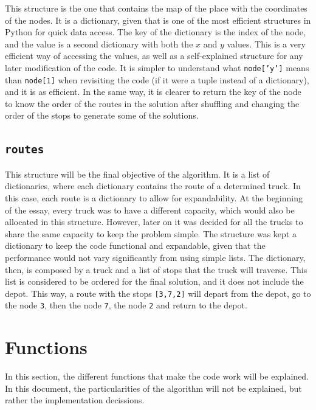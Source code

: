 \documentclass[11pt]{article}
\begin{document}
This structure is the one that contains the map of the place with the coordinates of the nodes. It is a dictionary, given that is one of the most efficient structures in Python for quick data access. The key of the dictionary is the index of the node, and the value is a second dictionary with both the $x$ and $y$ values. This is a very efficient way of accessing the values, as well as a self-explained structure for any later modification of the code. It is simpler to understand what \texttt{node['y']} means than \texttt{node[1]} when revisiting the code (if it were a tuple instead of a dictionary), and it is as efficient. In the same way, it is clearer to return the key of the node to know the order of the routes in the solution after shuffling and changing the order of the stops to generate some of the solutions. \\

\subsection{\texttt{routes}}

This structure will be the final objective of the algorithm. It is a list of dictionaries, where each dictionary contains the route of a determined truck. In this case, each route is a dictionary to allow for expandability. At the beginning of the essay, every truck was to have a different capacity, which would also be allocated in this structure. However, later on it was decided for all the trucks to share the same capacity to keep the problem simple. The structure was kept a dictionary to keep the code functional and expandable, given that the performance would not vary significantly from using simple lists. The dictionary, then, is composed by a truck and a list of stops that the truck will traverse. This list is considered to be ordered for the final solution, and it does not include the depot. This way, a route with the stops \texttt{[3,7,2]} will depart from the depot, go to the node \texttt{3}, then the node \texttt{7}, the node \texttt{2} and return to the depot. 

\section{Functions}

In this section, the different functions that make the code work will be explained. In this document, the particularities of the algorithm will not be explained, but rather the implementation decissions. \\
\end{document}
